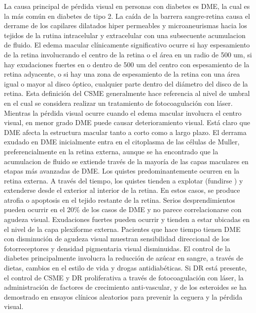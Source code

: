 \begin{description}
La causa principal de pérdida visual en personas con diabetes es DME, la cual es la más común en diabetes de tipo 2. La caída de la barrera sangre-retina causa el derrame de los capilares dilatados hiper permeables y microaneurismas hacia los tejidos de la rutina intracelular y extracelular con una subsecuente acumulacion de fluido. El edema macular clínicamente significativo ocurre si hay espesamiento de la retina involucrando el centro de la retina o el área en un radio de 500 um, si hay exudaciones fuertes en o dentro de 500 um del centro con espesamiento de la retina adyacente, o si hay una zona de espesamiento de la retina con una área igual o mayor al disco óptico, cualquier parte dentro del diámetro del disco de la retina. Esta definición del CSME generalmente hace referencia al nivel de umbral en el cual se considera realizar un tratamiento de fotocoagulación con láser. Mientras la pérdida visual ocurre cuando el edema macular involucra el centro visual, en menor grado DME puede causar deterioramiento visual.
Está claro que DME afecta la estructura macular tanto a corto como a largo plazo. El derrama exudado en DME inicialmente entra en el citoplasma de las células de Muller, preferencialmente en la retina externa, aunque se ha encontrado que la acumulacion de fluido se extiende través de la mayoría de las capas maculares en etapas más avanzadas de DME. Los quistes predominantemente ocurren en la retina externa. A través del tiempo, los quistes tienden a explotar (fundirse ) y extenderse desde el exterior al interior de la retina. En estos casos, se produce atrofia o apoptosis en el tejido restante de la retina. Serios desprendimientos pueden ocurrir en el 20\% de los casos de DME y no parece correlacionarse con agudeza visual. Exudaciones fuertes pueden ocurrir y tienden a estar ubicadas en el nivel de la capa plexiforme externa. Pacientes que hace tiempo tienen DME con disminución de agudeza visual muestran sensibilidad direccional de los fotorreceptores y densidad pigmentaria visual disminuidas.
El control de la diabetes principalmente involucra la reducción de azúcar en sangre, a través de dietas, cambios en el estilo de vida y drogas antidiabéticas. Si DR está presente,  el control de CSME y DR proliferativa a través de fotocoagulación con láser, la administración de factores de crecimiento anti-vascular, y de los esteroides se ha demostrado en ensayos clínicos aleatorios para prevenir la ceguera y la pérdida visual.

\end{description}
